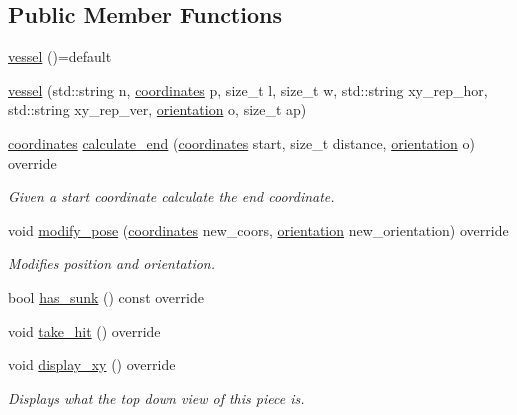 \subsection*{Public Member Functions}
\begin{DoxyCompactItemize}
\item 
\hyperlink{classbattle__ship_1_1vessel_a6f3be9c2343940c262fb7add97402311}{vessel} ()=default
\item 
\hyperlink{classbattle__ship_1_1vessel_ade7f1d4ee4b458a715a0259e5211db20}{vessel} (std\+::string n, \hyperlink{structbattle__ship_1_1coordinates}{coordinates} p, size\+\_\+t l, size\+\_\+t w, std\+::string xy\+\_\+rep\+\_\+hor, std\+::string xy\+\_\+rep\+\_\+ver, \hyperlink{namespacebattle__ship_aed87488f0a73f0d0679fe343fb61c784}{orientation} o, size\+\_\+t ap)
\item 
\hyperlink{structbattle__ship_1_1coordinates}{coordinates} \hyperlink{classbattle__ship_1_1vessel_a9b99c5ed2629203985b25338df585234}{calculate\+\_\+end} (\hyperlink{structbattle__ship_1_1coordinates}{coordinates} start, size\+\_\+t distance, \hyperlink{namespacebattle__ship_aed87488f0a73f0d0679fe343fb61c784}{orientation} o) override
\begin{DoxyCompactList}\small\item\em Given a start coordinate calculate the end coordinate. \end{DoxyCompactList}\item 
void \hyperlink{classbattle__ship_1_1vessel_ace0ec527147243b1fa6fa920d5a32a1f}{modify\+\_\+pose} (\hyperlink{structbattle__ship_1_1coordinates}{coordinates} new\+\_\+coors, \hyperlink{namespacebattle__ship_aed87488f0a73f0d0679fe343fb61c784}{orientation} new\+\_\+orientation) override
\begin{DoxyCompactList}\small\item\em Modifies position and orientation. \end{DoxyCompactList}\item 
bool \hyperlink{classbattle__ship_1_1vessel_a5f36d687fbb87ced436d2d88847a1d5c}{has\+\_\+sunk} () const override
\item 
void \hyperlink{classbattle__ship_1_1vessel_ab0da3c305902d55594b7aa5d20b69509}{take\+\_\+hit} () override
\item 
void \hyperlink{classbattle__ship_1_1vessel_a60924b058d686ebf545ae8f4d9f42d76}{display\+\_\+xy} () override
\begin{DoxyCompactList}\small\item\em Displays what the top down view of this piece is. \end{DoxyCompactList}\item 

\end{DoxyCompactItemize}
